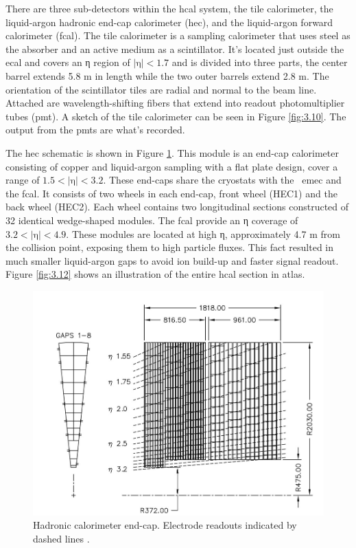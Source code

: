 There are three sub-detectors within the \gls{hcal} system, the tile calorimeter, the liquid-argon hadronic end-cap calorimeter (\gls{hec}),
and the liquid-argon forward calorimeter (\gls{fcal}). The tile calorimeter is a sampling calorimeter that uses steel as the absorber and an 
active medium as a scintillator. It's located just outside the \gls{ecal} and covers an η region of $|\textrm{η}| < \textrm{1.7}$ and is 
divided into three parts, the center barrel extends 5.8 m in length while the two outer barrels extend 2.8 m. The orientation 
of the scintillator tiles are radial and normal to the beam line. 
Attached are wavelength-shifting fibers that extend into readout photomultiplier tubes (\gls{pmt}). A sketch of the tile calorimeter can be 
seen in Figure \ref{fig:3.10}. The output from the \gls{pmt}s are what's recorded. 
\par
The \gls{hec} schematic is shown in Figure \ref{fig:3.11}. This module is an end-cap calorimeter consisting of copper and liquid-argon sampling with 
a flat plate design, cover a range of $\textrm{1.5} < |\textrm{η}| < \textrm{3.2}$. These end-caps share the cryostats with the \
\gls{emec} and the \gls{fcal}. It consists of two wheels in each end-cap, front wheel (HEC1) and the back wheel (HEC2). Each wheel 
contains two longitudinal sections constructed of 32 identical wedge-shaped modules. The \gls{fcal} provide an η coverage of 
$\textrm{3.2} < |\textrm{η}| < \textrm{4.9}$. These modules are located at high η, approximately 4.7 m from the collision point,
exposing them to high particle fluxes. This fact resulted in much smaller liquid-argon gaps to avoid ion build-up and faster signal 
readout. Figure \ref{fig:3.12} shows an illustration of the entire \gls{hcal} section in \gls{atlas}.

\begin{figure}[H]
  \centering
  \includegraphics[scale=0.5]{figs/ch3/hcal_barrel.jpg}
  \caption{ Hadronic calorimeter end-cap. Electrode readouts indicated by dashed lines . \cite{atlas}}
\label{fig:3.11}
\end{figure}

